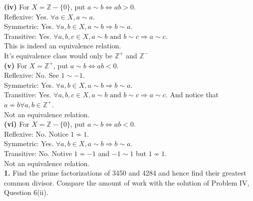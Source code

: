 \documentclass[paper=letter, fontsize=11pt]{scrartcl} %
\begin{document}
\textbf{(iv)} For $X = \mathbb{Z} - \{0\}$, put $a \sim b \Leftrightarrow a b > 0$.
\\

Reflexive: Yes. $\forall a \in X, a \sim a$. \\
Symmetric: Yes. $\forall a,b \in X, a \sim b \Rightarrow b \sim a$. \\
Transitive: Yes. $\forall a,b,c \in X, a \sim b \text{ and } b \sim c \Rightarrow a \sim c$. \\
This is indeed an equivalence relation. \\
It's equivalence class would only be $\mathbb{Z}^+$ and $\mathbb{Z}^{-}$
\\

\textbf{(v)} For $X = \mathbb{Z}^+$, put $a \sim b \Leftrightarrow a b < 0$.
\\

Reflexive: No. See $1 \sim -1$. \\
Symmetric: Yes. $\forall a,b \in X, a \sim b \Rightarrow b \sim a$. \\
Transitive: Yes. $\forall a,b,c \in X, a \sim b \text{ and } b \sim c \Rightarrow a \sim c$.
And notice that $a \not\sim b \forall a,b \in \mathbb{Z}^+$. \\
Not an equivalence relation. \\

\textbf{(vi)} For $X = \mathbb{Z} - \{0\}$, put $a \sim b \Leftrightarrow a b < 0$.
\\

Reflexive: No. Notice $1 \not\sim 1$. \\
Symmetric: Yes. $\forall a,b \in X, a \sim b \Rightarrow b \sim a$. \\
Transitive: No. Notive $1 \not\sim -1$ and $-1 \sim 1$ but $1 \not\sim 1$. \\ 
Not an equivalence relation. \\

\textbf{1.} Find the prime factorizations of 3450 and 4284 and hence find their greatest
common divisor. Compare the amount of work with the solution of Problem IV, Question 6(ii).
\\
\end{document}

